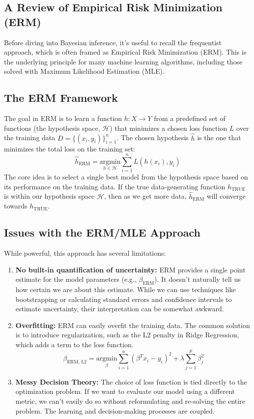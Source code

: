 \documentclass{article}
\begin{document}
\begin{multicols}{2}
\section{A Review of Empirical Risk Minimization (ERM)}
Before diving into Bayesian inference, it's useful to recall the frequentist approach, which is often framed as Empirical Risk Minimization (ERM). This is the underlying principle for many machine learning algorithms, including those solved with Maximum Likelihood Estimation (MLE).

\subsection{The ERM Framework}
The goal in ERM is to learn a function $h: X \rightarrow Y$ from a predefined set of functions (the hypothesis space, $\mathcal{H}$) that minimizes a chosen loss function $L$ over the training data $D = \{(x_i, y_i)\}_{i=1}^n$.
The chosen hypothesis $\hat{h}$ is the one that minimizes the total loss on the training set:
$$ \hat{h}_{\text{ERM}} = \underset{h \in \mathcal{H}}{\text{argmin}} \sum_{i=1}^{n} L(h(x_i), y_i) $$
The core idea is to select a single best model from the hypothesis space based on its performance on the training data. If the true data-generating function $h_{\text{TRUE}}$ is within our hypothesis space $\mathcal{H}$, then as we get more data, $\hat{h}_{\text{ERM}}$ will converge towards $h_{\text{TRUE}}$.

\subsection{Issues with the ERM/MLE Approach}
While powerful, this approach has several limitations:
\begin{enumerate}
    \item \textbf{No built-in quantification of uncertainty:} ERM provides a single point estimate for the model parameters (e.g., $\beta_{\text{ERM}}$). It doesn't naturally tell us how certain we are about this estimate. While we can use techniques like bootstrapping or calculating standard errors and confidence intervals to estimate uncertainty, their interpretation can be somewhat awkward.
    \item \textbf{Overfitting:} ERM can easily overfit the training data. The common solution is to introduce regularization, such as the L2 penalty in Ridge Regression, which adds a term to the loss function.
    $$ \beta_{\text{ERM, L2}} = \underset{\beta}{\text{argmin}} \sum_{i=1}^{n} (\beta^T x_i - y_i)^2 + \lambda \sum_{j=1}^{p} \beta_j^2 $$
    \item \textbf{Messy Decision Theory:} The choice of loss function is tied directly to the optimization problem. If we want to evaluate our model using a different metric, we can't easily do so without reformulating and re-solving the entire problem. The learning and decision-making processes are coupled.
\end{enumerate}


\end{multicols}
\end{document}
